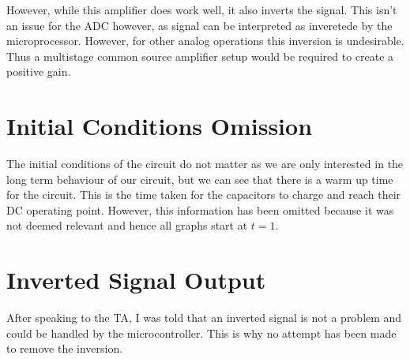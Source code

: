 \documentclass[journal]{IEEEtran}
\begin{document}
However, while this amplifier does work well, it also inverts the signal. This isn't an issue for the ADC however, as signal can be interpreted as inveretede by the microprocessor. However, for other analog operations this inversion is undesirable. Thus a multistage common source amplifier setup would be required to create a positive gain.



%

\listoffigures

\appendices
\section{Initial Conditions Omission}
The initial conditions of the circuit do not matter as we are only interested in the long term behaviour of our circuit, but we can see that there is a warm up time for the circuit. This is the time taken for the capacitors to charge and reach their DC operating point. However, this information has been omitted because it was not deemed relevant and hence all graphs start at $t=1$.

\section{Inverted Signal Output}
After speaking to the TA, I was told that an inverted signal is not a problem and could be handled by the microcontroller. This is why no attempt has been made to remove the inversion.
\end{document}
